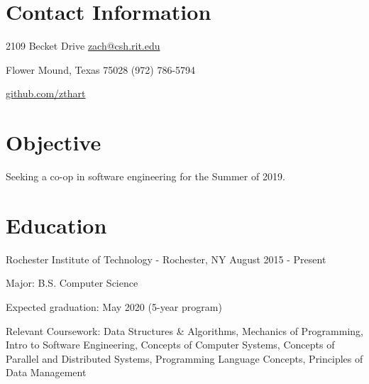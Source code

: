\documentclass[margin,line]{resume}
\newcommand{\rurl}[1]{\hfill {\footnotesize \url{#1}}}
\newcommand{\rdate}[1]{\hfill {\small #1}}
\begin{document}
\begin{resume}
\section{\mysidestyle Contact Information} 
	\begin{asparablank}
		\item 2109 Becket Drive  \hfill \href{mailto:zach@csh.rit.edu}{zach@csh.rit.edu}
		\item Flower Mound, Texas 75028 \hfill (972) 786-5794
		\item \hfill \rurl{github.com/zthart}
    \end{asparablank}

\section{\mysidestyle Objective}
	\begin{asparablank}
    	\item Seeking a co-op in software engineering for the Summer of 2019.
        \normalsize
        \\
	\end{asparablank}

\section{\mysidestyle Education}
	\begin{compactdesc}
		\item[Rochester Institute of Technology] - Rochester, NY \rdate{August 2015 - Present}
		\begin{compactitem} { \small
			\item Major: B.S. Computer Science
			\item Expected graduation: May 2020 (5-year program)
            \item Relevant Coursework: Data Structures \& Algorithms, Mechanics of Programming, Intro to Software Engineering, Concepts of Computer Systems, Concepts of Parallel and Distributed Systems, Programming Language Concepts, Principles of Data Management
		} \end{compactitem}
	\end{compactdesc}


\end{resume}
\end{document}
